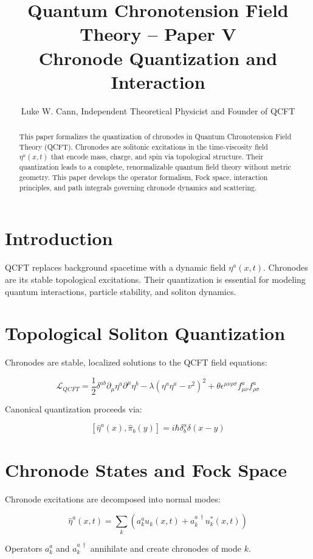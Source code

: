 \documentclass[12pt]{article}
\title{Quantum Chronotension Field Theory – Paper V\\\large Chronode Quantization and Interaction}
\author{Luke W. Cann, Independent Theoretical Physicist and Founder of QCFT}
\date{}
\begin{document}
\maketitle

\begin{abstract}
This paper formalizes the quantization of chronodes in Quantum Chronotension Field Theory (QCFT). Chronodes are solitonic excitations in the time-viscosity field $\eta^a(x,t)$ that encode mass, charge, and spin via topological structure. Their quantization leads to a complete, renormalizable quantum field theory without metric geometry. This paper develops the operator formalism, Fock space, interaction principles, and path integrals governing chronode dynamics and scattering.
\end{abstract}

\section{Introduction}

QCFT replaces background spacetime with a dynamic field $\eta^a(x,t)$. Chronodes are its stable topological excitations. Their quantization is essential for modeling quantum interactions, particle stability, and soliton dynamics.

\section{Topological Soliton Quantization}

Chronodes are stable, localized solutions to the QCFT field equations:

\[
\mathcal{L}_{QCFT} = \frac{1}{2} \delta^{ab} \partial_\mu \eta^a \partial^\mu \eta^b - \lambda (\eta^a \eta^a - v^2)^2 + \theta \epsilon^{\mu\nu\rho\sigma} f_{\mu\nu}^a f_{\rho\sigma}^a
\]

Canonical quantization proceeds via:

\[
[ \hat{\eta}^a(x), \hat{\pi}_b(y) ] = i \hbar \delta^a_b \delta(x - y)
\]

\section{Chronode States and Fock Space}

Chronode excitations are decomposed into normal modes:

\[
\hat{\eta}^a(x,t) = \sum_k \left( a_k^a u_k(x,t) + a_k^{a\,\dagger} u_k^*(x,t) \right)
\]

Operators $a_k^a$ and $a_k^{a\,\dagger}$ annihilate and create chronodes of mode $k$.
\end{document}
